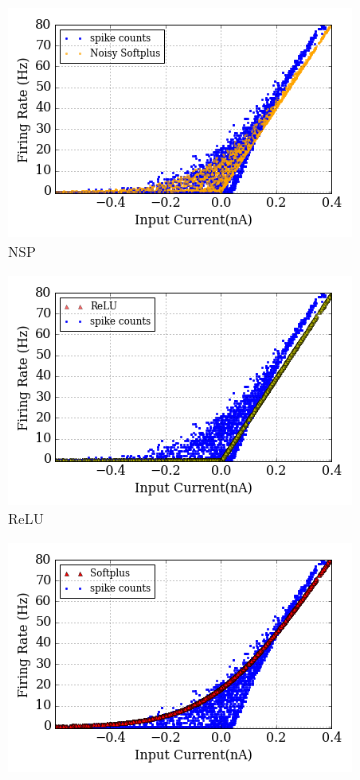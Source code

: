 \documentclass[10pt,journal,compsoc]{IEEEtran}
\begin{document}
	\begin{figure}[hb!]
		\centering
		\begin{subfigure}[hb]{0.32\textwidth}
			\includegraphics[width=\textwidth]{pics_iconip/6-5-3.png}
			\caption{NSP}
		\end{subfigure}
		\begin{subfigure}[hb]{0.32\textwidth}
			\includegraphics[width=\textwidth]{pics_iconip/6-5-2.png}
			\caption{ReLU}
		\end{subfigure}
		\begin{subfigure}[hb]{0.32\textwidth}
			\includegraphics[width=\textwidth]{pics_iconip/6-5-1.png}

\end{subfigure}
\end{figure}
\end{document}
